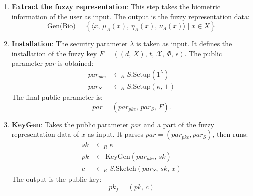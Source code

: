 \documentclass[graybox]{svmult}
\begin{document}
\begin{enumerate}
    \item \textbf{Extract the fuzzy representation}: This step takes the biometric information of the user as input. The output is the fuzzy representation data:
          \begin{equation}
              \text{Gen(Bio)} = \left\{ \langle x,\, \mu_A(x),\, \eta_A(x),\, \nu_A(x) \rangle \mid x \in X \right\}
          \end{equation}

    \item \textbf{Installation}: The security parameter \( \lambda \) is taken as input. It defines the \break installation of the fuzzy key \( F = ((d,\, X),\, t,\, \mathcal{X},\, \varPhi,\, \epsilon) \). The public parameter \(  par \) is obtained:
          \begin{align}
              par_{pke} & \leftarrow_R S.\text{Setup}(1^\lambda) \\[6pt]
              par_S     & \leftarrow_R S.\text{Setup}(\kappa, +)
          \end{align}
          The final public parameter is:
          \begin{equation}
              par  = (par_{pke},\, par_S,\, F).
          \end{equation}

    \item \textbf{KeyGen}: Takes the public parameter \(  par \) and a part of the fuzzy representation data of \( x \) as input. It parses \( par  = (par_{pke}, par_S) \), then runs:
          \begin{align}
              sk & \leftarrow_R \kappa                              \\[6pt]
              pk & \leftarrow \text{KeyGen}(par_{pke}, \, sk)       \\[6pt]
              c  & \leftarrow_R S.\text{Sketch}(par_S, \, sk, \, x)
          \end{align}
          The output is the public key:
          \begin{equation}
              pk_f = (pk,\, c)
          \end{equation}


\end{enumerate}
\end{document}
